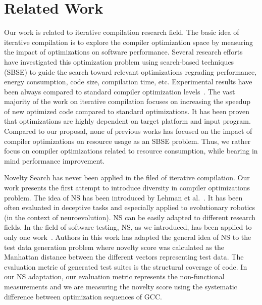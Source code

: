 \section{Related Work}
Our work is related to iterative compilation research field.
The basic idea of iterative compilation is to explore the compiler optimization space by measuring the impact of optimizations on software performance.
Several research efforts have investigated this optimization problem using search-based techniques (SBSE) to guide the search toward relevant optimizations regrading performance, energy consumption, code size, compilation time, etc. Experimental results have been always compared to standard compiler optimization levels~\cite{almagor2004finding,hoste2008cole,pan2006fast,zhong2009tuning,pallister2015identifying,chen2012deconstructing,sandran2012genetic,martins2014exploration,fursin2008milepost,lin2008automatic,schulte2014post,martinez2014multi,hoste2008cole}.  
The vast majority of the work on iterative compilation focuses on increasing the speedup of new optimized code compared to standard optimizations. 
It has been proven that optimizations are highly dependent on target platform and input program. 
Compared to our proposal, none of previous works has focused on the impact of compiler optimizations on resource usage as an SBSE problem. Thus, we rather focus on compiler optimizations related to resource consumption, while bearing in mind performance improvement.

Novelty Search has never been applied in the filed of iterative compilation. Our work presents the first attempt to introduce diversity in compiler optimizations problem. 
The idea of NS has been introduced by Lehman et al.~\cite{lehman2008exploiting}. It has been often evaluated in deceptive tasks and especially applied to evolutionary robotics~\cite{risi2010evolving,krvcah2012solving} (in the context of neuroevolution). 
NS can be easily adapted to different research fields. In the field of software testing, NS, as we introduced, has been applied to only one work~\cite{boussaa2015novelty}. Authors in this work has adapted the general idea of NS to the test data generation problem where novelty score was calculated as the Manhattan distance between the different vectors representing test data. The evaluation metric of generated test suites is the structural coverage of code.
In our NS adaptation, our evaluation metric represents the non-functional measurements and we are measuring the novelty score using the systematic difference between optimization sequences of GCC. 

